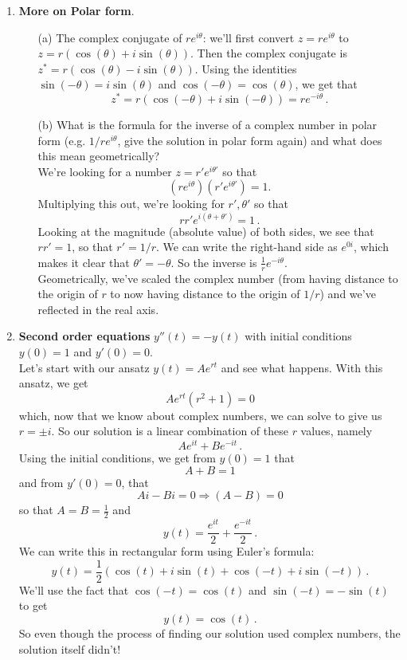 \documentclass[11pt,a4paper]{scrartcl}
\begin{document}
\begin{enumerate}
	\item  \textbf{More on Polar form}. 
	\begin{itemize}
		\item[(a)] The complex conjugate of $re^{i\theta}$: we'll first convert $z = re^{i\theta}$ to $z = r(\cos(\theta) + i\sin(\theta))$. Then the complex conjugate is $z^* = r(\cos(\theta) - i\sin(\theta))$. Using the identities $\sin(-\theta) = i\sin(\theta)$ and $\cos(-\theta) = \cos(\theta)$, we get that 
        \[
        z^* = r(\cos(-\theta) + i\sin(-\theta)) = re^{-i\theta}\,.
        \]
        
		\item[(b)] What is the formula for the inverse of a complex number in polar form (e.g. $1/re^{i\theta}$, give the
		solution in polar form again) and what does this mean geometrically?\\
        We're looking for a number $z = r'e^{i\theta'}$ so that
        \[
        (re^{i\theta})(r'e^{i\theta'}) = 1.
        \] 
        Multiplying this out, we're looking for $r', \theta'$ so that
        \[rr' e^{i(\theta + \theta')}= 1\,.\]
        Looking at the magnitude (absolute value) of both sides, we see that $rr'=1$, so that $r' = 1/r$. We can write the right-hand side as $e^{0i}$, which makes it clear that $\theta' =-\theta$.
        So the inverse is $\frac1re^{-i\theta}$.\\
        Geometrically, we've scaled the complex number (from having distance to the origin of $r$ to now having distance to the origin of $1/r$) and we've reflected in the real axis. 
	\end{itemize}
    
\item \textbf{Second order equations} 	
$y''(t) = -y(t)$ with initial conditions $y(0) = 1$ and $y'(0) = 0$.\\
        Let's start with our ansatz $y(t) = Ae^{rt}$ and see what happens. With this ansatz, we get
        \[
        Ae^{rt}(r^2+1) = 0 
        \]
        which, now that we know about complex numbers, we can solve to give us $r= \pm i$. So our solution is a linear combination of these $r$ values, namely 
        \[
        Ae^{it} + Be^{-it}\,.
        \]
        Using the initial conditions, we get from $y(0)=1$ that 
        \[
        A+B  = 1
        \]
        and from $y'(0)=0$, that 
        \[
        Ai - Bi = 0 \Rightarrow (A-B) =0 
        \]
        so that $A = B = \frac12$ and  
        \[
        y(t) = \frac{e^{it}}{2} + \frac{e^{-it}}{2}\,. 
        \]
        We can write this in rectangular form using Euler's formula:
        \[
        y(t) = \frac12 \left(\cos(t) + i\sin(t) + \cos(-t) +i\sin(-t)\right)\,.
        \]
        We'll use the fact that $\cos(-t) = \cos(t)$ and $\sin(-t) = -\sin(t)$ to get
        \[
        y(t) = \cos(t)\,.
        \]
        So even though the process of finding our solution used complex numbers, the solution itself didn't!
    
\end{enumerate}
\end{document}
